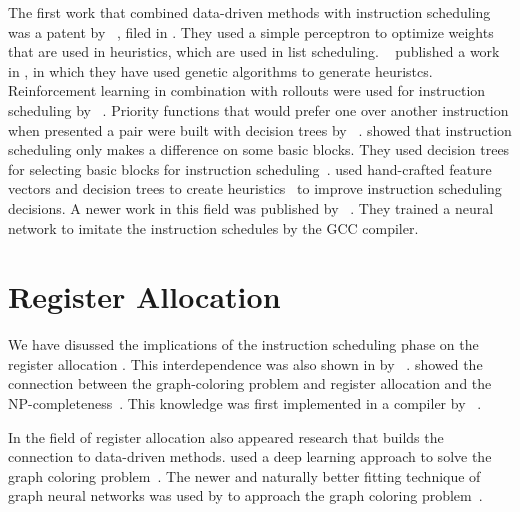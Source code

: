 The first work that combined data-driven methods with instruction scheduling was a patent by \citeauthor{tarsy1994method}~\cite{tarsy1994method}, filed in \citeyear{tarsy1994method}.
They used a simple perceptron to optimize weights that are used in heuristics, which are used in list scheduling.
\citeauthor{beaty1996using}~\cite{beaty1996using} published a work in \citeyear{beaty1996using}, in which they have used genetic algorithms to generate heuristcs.
Reinforcement learning in combination with rollouts were used for instruction scheduling by \citeauthor{mcgovern1999scheduling}~\cite{mcgovern1999scheduling,mcgovern2002building}.
Priority functions that would prefer one over another instruction when presented a pair were built with decision trees by \citeauthor{moss1998learning}~\cite{moss1998learning}.
\citeauthor{cavazos2004inducing} showed that instruction scheduling only makes a difference on some basic blocks.
They used decision trees for selecting basic blocks for instruction scheduling~\cite{cavazos2004inducing}.
\citeauthor{russell2006learning} used hand-crafted feature vectors and decision trees to create heuristics~\cite{russell2006learning} to improve instruction scheduling decisions.
A newer work in this field was published by \citeauthor{jain2019learning}~\cite{jain2019learning}.
They trained a neural network to imitate the instruction schedules by the GCC compiler.

\section{Register Allocation}
\label{sec:rw:register-allocation}
We have disussed the implications of the instruction scheduling phase on the register allocation .
This interdependence was also shown in by \citeauthor{goodman1988code}~\cite{goodman1988code}.
\citeauthor{lavrov1962store} showed the connection between the graph-coloring problem and register allocation and the NP-completeness~\cite{lavrov1962store}.
This knowledge was first implemented in a compiler by \citeauthor{chaitin1982register}~\cite{chaitin1982register}.

In the field of register allocation also appeared research that builds the connection to data-driven methods.
\citeauthor{das2019deep} used a deep learning approach to solve the graph coloring problem~\cite{das2019deep}.
The newer and naturally better fitting technique of graph neural networks was used by \citeauthor{lemos2019graph} to approach the graph coloring problem~\cite{lemos2019graph}. 

